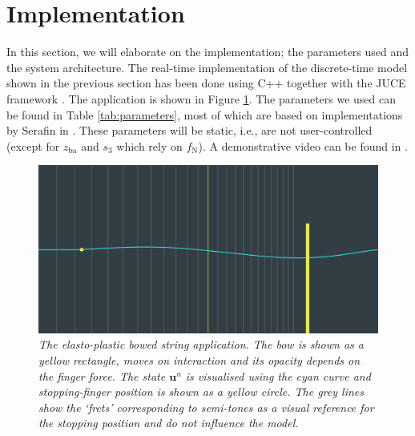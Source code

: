     \section{Implementation}\label{sec:implementation}
    In this section, we will elaborate on the implementation; the parameters used and the system architecture. The real-time implementation of the discrete-time model shown in the previous section has been done using C++ together with the JUCE framework \cite{JUCE}. The application is shown in Figure \ref{fig:application}. The parameters we used can be found in Table \ref{tab:parameters}, most of which are based on implementations by Serafin in \cite{Serafin2004}. These parameters will be static, i.e., are not user-controlled (except for $z_\text{ba}$ and $s_3$ which rely on $f_\text{N}$). A demonstrative video can be found in \cite{video}.
        \begin{figure}[ht]
    \centerline{\includegraphics[width=\paperFigWidth\textwidth]{figures/JUCEapp.png}}
    \caption{\label{fig:application}{\it The elasto-plastic bowed string application. The bow is shown as a yellow rectangle, moves on interaction and its opacity depends on the finger force. The state $\mathbf{u}^n$ is visualised using the cyan curve and stopping-finger position is shown as a yellow circle. The grey lines show the `frets' corresponding to semi-tones as a visual reference for the stopping position and do not influence the model.}}
    \end{figure}
